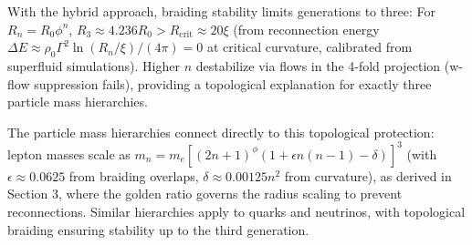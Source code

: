 With the hybrid approach, braiding stability limits generations to three: For $R_n = R_0 \phi^n$, $R_3 \approx 4.236 R_0 > R_{\text{crit}} \approx 20 \xi$ (from reconnection energy $\Delta E \approx \rho_0 \Gamma^2 \ln(R_n / \xi) / (4\pi) = 0$ at critical curvature, calibrated from superfluid simulations). Higher $n$ destabilize via flows in the 4-fold projection (w-flow suppression fails), providing a topological explanation for exactly three particle mass hierarchies.

The particle mass hierarchies connect directly to this topological protection: lepton masses scale as $m_n = m_e [(2n+1)^\phi (1 + \epsilon n(n-1) - \delta)]^3$ (with $\epsilon \approx 0.0625$ from braiding overlaps, $\delta \approx 0.00125 n^2$ from curvature), as derived in Section 3, where the golden ratio governs the radius scaling to prevent reconnections. Similar hierarchies apply to quarks and neutrinos, with topological braiding ensuring stability up to the third generation.

\medskip
